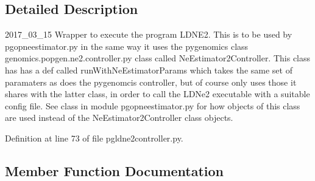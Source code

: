\subsection{Detailed Description}
\begin{DoxyVerb}2017_03_15
Wrapper to execute the program LDNE2.  This is to be used
by pgopneestimator.py in the same way it uses the pygenomics 
class genomics.popgen.ne2.controller.py class called 
NeEstimator2Controller.  This class has has a def called
runWithNeEstimatorParams which takes the same set of 
paramaters as does the pygenomcis controller,
but of course only uses those it shares with the latter class,
in order to call the LDNe2 executable with a suitable config 
file.  See class in module pgopneestimator.py for how objects
of this class are used instead of the NeEstimator2Controller
class objects.
\end{DoxyVerb}
 

Definition at line 73 of file pgldne2controller.\+py.



\subsection{Member Function Documentation}
